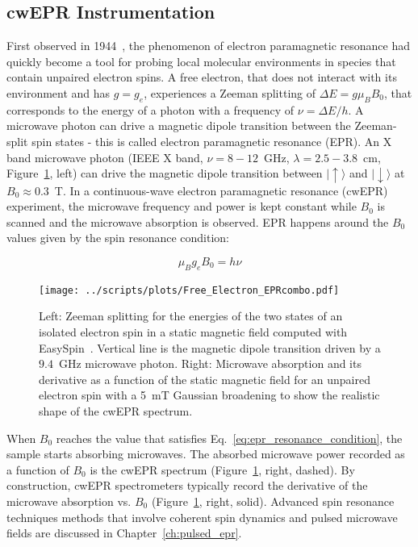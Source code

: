 \subsection{cwEPR Instrumentation}
\label{subs:cwEPR_spectroscopy}
First observed in 1944~\cite{Zavoisky_1945_JP,zavoisky_1945,salikhov_2015}, the phenomenon of electron paramagnetic resonance had quickly become a tool for probing local molecular environments in species that contain unpaired electron spins. A free electron, that does not interact with its environment and has $g=g_e$, experiences a Zeeman splitting of $\Delta E = g \mu_B B_0$, that corresponds to the energy of a photon with a frequency of $\nu=\Delta E / h$. A microwave photon can drive a magnetic dipole transition between the Zeeman-split spin states - this is called electron paramagnetic resonance (EPR). An X band microwave photon (IEEE X band, $\nu=8-12$~GHz, $\lambda=2.5-3.8$~cm, Figure~\ref{fig:cwerp_free_electron}, left) can drive the magnetic dipole transition between $\vert{\uparrow\rangle}$ and $\vert{\downarrow\rangle}$ at $B_0\approx0.3$~T. In a continuous-wave electron paramagnetic resonance (cwEPR) experiment, the microwave frequency and power is kept constant while $B_0$ is scanned and the microwave absorption is observed. EPR happens around the $B_0$ values given by the spin resonance condition:

\begin{equation}
\label{eq:epr_resonance_condition}
\mu_B g_e B_0 = h\nu
\end{equation}

\begin{figure}[h]
\center
	\texttt{[image: ../scripts/plots/Free\_Electron\_EPRcombo.pdf]}
	\caption{Left: Zeeman splitting for the energies of the two states of an isolated electron spin in a static magnetic field computed with EasySpin~\cite{Stoll2006}. Vertical line is the magnetic dipole transition driven by a $9.4$~GHz microwave photon. Right: Microwave absorption and its derivative as a function of the static magnetic field for an unpaired electron spin with a 5~mT Gaussian broadening to show the realistic shape of the cwEPR spectrum.}
	\label{fig:cwerp_free_electron}
\end{figure}


\par
When $B_0$ reaches the value that satisfies Eq.~\ref{eq:epr_resonance_condition}, the sample starts absorbing microwaves. The absorbed microwave power recorded as a function of $B_0$ is the cwEPR spectrum (Figure~\ref{fig:cwerp_free_electron}, right, dashed). By construction, cwEPR spectrometers typically record the derivative of the microwave absorption vs. $B_0$ (Figure~\ref{fig:cwerp_free_electron}, right, solid). Advanced spin resonance techniques methods that involve coherent spin dynamics and pulsed microwave fields are discussed in Chapter~\ref{ch:pulsed_epr}.

